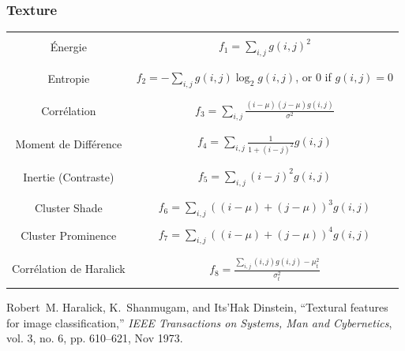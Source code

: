 \documentclass[compress]{beamer}
\begin{document}
\begin{frame}
\frametitle{Texture}
\tiny \centering
\begin{tabular}{cc}
& \\
Énergie & $ f_1 = \sum_{i,j}g(i, j)^2 $ \\
& \\
& \\
Entropie & $ f_2 = -\sum_{i,j}g(i, j) \log_2 g(i, j)$, or 0 if $g(i, j) = 0$ \\
& \\
& \\
Corrélation & $ f_3 = \sum_{i,j}\frac{(i - \mu)(j - \mu)g(i, j)}{\sigma^2} $ \\
& \\
& \\
Moment de Différence&  $f_4 = \sum_{i,j}\frac{1}{1 + (i - j)^2}g(i, j) $ \\
& \\
& \\
Inertie (Contraste) & $ f_5 = \sum_{i,j}(i - j)^2g(i, j) $ \\
& \\
& \\
Cluster Shade & $ f_6 = \sum_{i,j}((i - \mu) + (j - \mu))^3 g(i, j) $ \\
& \\
Cluster Prominence & $ f_7 = \sum_{i,j}((i - \mu) + (j - \mu))^4 g(i, j) $ \\
& \\
& \\
Corrélation de Haralick& $ f_8 = \frac{\sum_{i,j}(i, j) g(i, j) -\mu_t^2}{\sigma_t^2} $ \\
& \\
\end{tabular}
\begin{thebibliography}{noidea}
\tiny
{}
Robert~M. Haralick, K.~Shanmugam, and Its'Hak Dinstein,
 ``Textural features for image classification,''
 {\em IEEE Transactions on Systems, Man and Cybernetics}, vol. 3, no.
  6, pp. 610--621, Nov 1973.
\end{thebibliography}
\end{frame}
\end{document}
